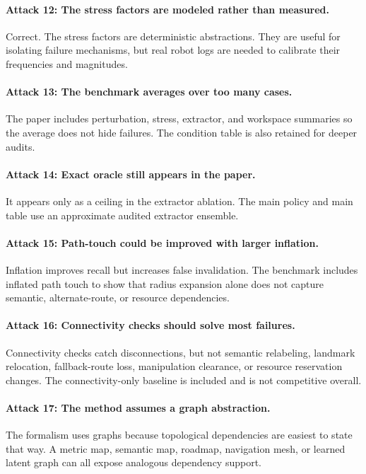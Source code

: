\documentclass{article}
\begin{document}
\paragraph{Attack 12: The stress factors are modeled rather than measured.}
Correct. The stress factors are deterministic abstractions. They are useful for isolating failure mechanisms, but real robot logs are needed to calibrate their frequencies and magnitudes.

\paragraph{Attack 13: The benchmark averages over too many cases.}
The paper includes perturbation, stress, extractor, and workspace summaries so the average does not hide failures. The condition table is also retained for deeper audits.

\paragraph{Attack 14: Exact oracle still appears in the paper.}
It appears only as a ceiling in the extractor ablation. The main policy and main table use an approximate audited extractor ensemble.

\paragraph{Attack 15: Path-touch could be improved with larger inflation.}
Inflation improves recall but increases false invalidation. The benchmark includes inflated path touch to show that radius expansion alone does not capture semantic, alternate-route, or resource dependencies.

\paragraph{Attack 16: Connectivity checks should solve most failures.}
Connectivity checks catch disconnections, but not semantic relabeling, landmark relocation, fallback-route loss, manipulation clearance, or resource reservation changes. The connectivity-only baseline is included and is not competitive overall.

\paragraph{Attack 17: The method assumes a graph abstraction.}
The formalism uses graphs because topological dependencies are easiest to state that way. A metric map, semantic map, roadmap, navigation mesh, or learned latent graph can all expose analogous dependency support.
\end{document}
